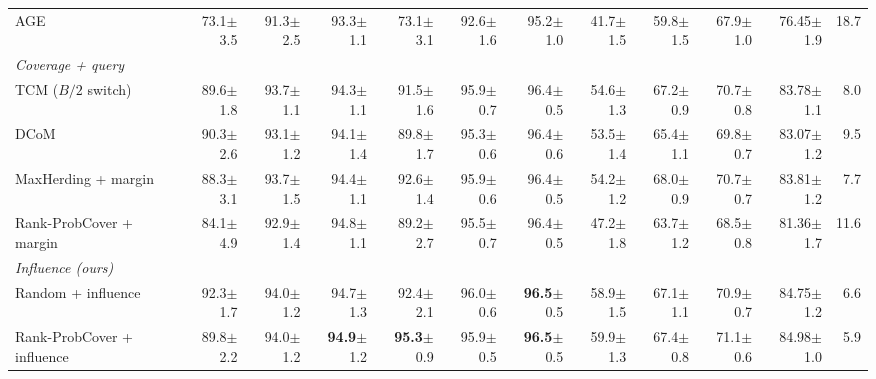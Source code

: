 \begin{table}[t]
\begin{adjustbox}{max width=\textwidth}
\begin{tabular}{lrrrrrrrrrrr}
\quad AGE~\cite{cai2017active} & 73.1{\scriptsize$\pm$3.5} & 91.3{\scriptsize$\pm$2.5} & 93.3{\scriptsize$\pm$1.1} & 73.1{\scriptsize$\pm$3.1} & 92.6{\scriptsize$\pm$1.6} & 95.2{\scriptsize$\pm$1.0} & 41.7{\scriptsize$\pm$1.5} & 59.8{\scriptsize$\pm$1.5} & 67.9{\scriptsize$\pm$1.0} & 76.45{\scriptsize$\pm$1.9} & 18.7 \\
\multicolumn{12}{l}{\textit{Coverage + query}} \\
\quad TCM ($B/2$ switch)~\cite{doucet2024bridging} & 89.6{\scriptsize$\pm$1.8} & 93.7{\scriptsize$\pm$1.1} & 94.3{\scriptsize$\pm$1.1} & 91.5{\scriptsize$\pm$1.6} & 95.9{\scriptsize$\pm$0.7} & 96.4{\scriptsize$\pm$0.5} & 54.6{\scriptsize$\pm$1.3} & 67.2{\scriptsize$\pm$0.9} & 70.7{\scriptsize$\pm$0.8} & 83.78{\scriptsize$\pm$1.1} & 8.0 \\
\quad DCoM~\cite{mishal2024dcom} & 90.3{\scriptsize$\pm$2.6} & 93.1{\scriptsize$\pm$1.2} & 94.1{\scriptsize$\pm$1.4} & 89.8{\scriptsize$\pm$1.7} & 95.3{\scriptsize$\pm$0.6} & 96.4{\scriptsize$\pm$0.6} & 53.5{\scriptsize$\pm$1.4} & 65.4{\scriptsize$\pm$1.1} & 69.8{\scriptsize$\pm$0.7} & 83.07{\scriptsize$\pm$1.2} & 9.5 \\
\quad MaxHerding + margin & 88.3{\scriptsize$\pm$3.1} & 93.7{\scriptsize$\pm$1.5} & 94.4{\scriptsize$\pm$1.1} & 92.6{\scriptsize$\pm$1.4} & 95.9{\scriptsize$\pm$0.6} & 96.4{\scriptsize$\pm$0.5} & 54.2{\scriptsize$\pm$1.2} & 68.0{\scriptsize$\pm$0.9} & 70.7{\scriptsize$\pm$0.7} & 83.81{\scriptsize$\pm$1.2} & 7.7 \\
\quad Rank-ProbCover + margin & 84.1{\scriptsize$\pm$4.9} & 92.9{\scriptsize$\pm$1.4} & 94.8{\scriptsize$\pm$1.1} & 89.2{\scriptsize$\pm$2.7} & 95.5{\scriptsize$\pm$0.7} & 96.4{\scriptsize$\pm$0.5} & 47.2{\scriptsize$\pm$1.8} & 63.7{\scriptsize$\pm$1.2} & 68.5{\scriptsize$\pm$0.8} & 81.36{\scriptsize$\pm$1.7} & 11.6 \\
\multicolumn{12}{l}{\textit{Influence (ours)}} \\
\quad Random + influence & 92.3{\scriptsize$\pm$1.7} & 94.0{\scriptsize$\pm$1.2} & 94.7{\scriptsize$\pm$1.3} & 92.4{\scriptsize$\pm$2.1} & 96.0{\scriptsize$\pm$0.6} & \textbf{96.5}{\scriptsize$\pm$0.5} & 58.9{\scriptsize$\pm$1.5} & 67.1{\scriptsize$\pm$1.1} & 70.9{\scriptsize$\pm$0.7} & 84.75{\scriptsize$\pm$1.2} & 6.6 \\
\quad Rank-ProbCover + influence & 89.8{\scriptsize$\pm$2.2} & 94.0{\scriptsize$\pm$1.2} & \textbf{94.9}{\scriptsize$\pm$1.2} & \textbf{95.3}{\scriptsize$\pm$0.9} & 95.9{\scriptsize$\pm$0.5} & \textbf{96.5}{\scriptsize$\pm$0.5} & 59.9{\scriptsize$\pm$1.3} & 67.4{\scriptsize$\pm$0.8} & 71.1{\scriptsize$\pm$0.6} & 84.98{\scriptsize$\pm$1.0} & 5.9 \\

\end{tabular}
\end{adjustbox}
\end{table}
